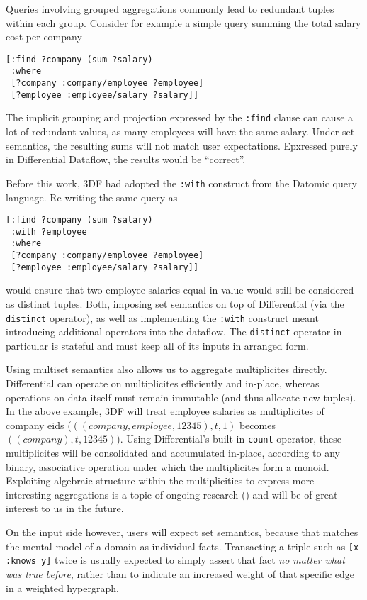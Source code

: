 \documentclass[../index.tex]{subfiles}
\begin{document}
Queries involving grouped aggregations commonly lead to redundant
tuples within each group. Consider for example a simple query summing
the total salary cost per company

\begin{verbatim}
[:find ?company (sum ?salary)
 :where
 [?company :company/employee ?employee]
 [?employee :employee/salary ?salary]]
\end{verbatim}

The implicit grouping and projection expressed by the \texttt{:find}
clause can cause a lot of redundant values, as many employees will
have the same salary. Under set semantics, the resulting sums will not
match user expectations. Epxressed purely in Differential Dataflow,
the results would be ``correct''.

Before this work, 3DF had adopted the \texttt{:with} construct from
the Datomic query language. Re-writing the same query as

\begin{verbatim}
[:find ?company (sum ?salary)
 :with ?employee
 :where
 [?company :company/employee ?employee]
 [?employee :employee/salary ?salary]]
\end{verbatim}

would ensure that two employee salaries equal in value would still be
considered as distinct tuples. Both, imposing set semantics on top of
Differential (via the \texttt{distinct} operator), as well as
implementing the \texttt{:with} construct meant introducing additional
operators into the dataflow. The \texttt{distinct} operator in
particular is stateful and must keep all of its inputs in arranged
form.

Using multiset semantics also allows us to aggregate multiplicites
directly. Differential can operate on multiplicites efficiently and
in-place, whereas operations on data itself must remain immutable (and
thus allocate new tuples). In the above example, 3DF will treat
employee salaries as multiplicites of company eids ($((company,
employee, 12345), t, 1)$ becomes $((company), t, 12345)$). Using
Differential's built-in \texttt{count} operator, these multiplicites
will be consolidated and accumulated in-place, according to any
binary, associative operation under which the multiplicites form a
monoid. Exploiting algebraic structure within the multiplicities to
express more interesting aggregations is a topic of ongoing research
(\cite{abo2016faq}) and will be of great interest to us in the future.

On the input side however, users will expect set semantics, because
that matches the mental model of a domain as individual
facts. Transacting a triple such as \texttt{[x :knows y]} twice is
usually expected to simply assert that fact \emph{no matter what was
  true before}, rather than to indicate an increased weight of that
specific edge in a weighted hypergraph.
\end{document}
